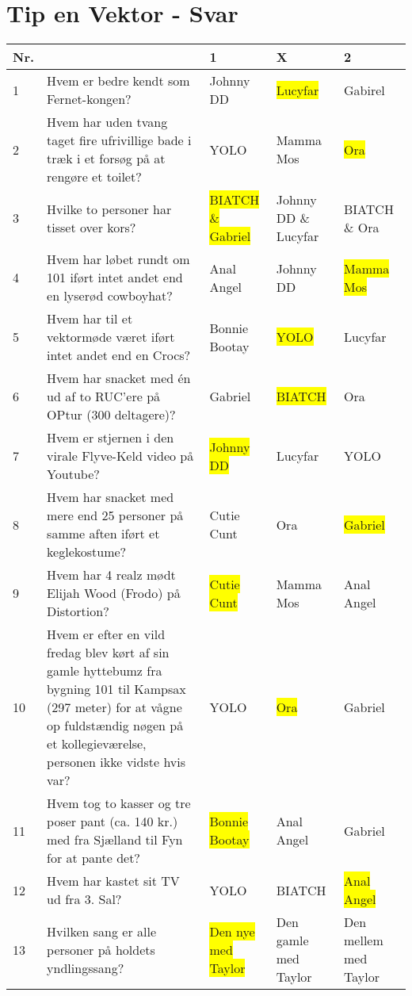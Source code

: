 \section{Tip en Vektor - Svar}
\begin{tabular}{ | p{0.5cm} | p{7cm} | p{2cm} | p{2cm} | p{2.3cm} | }
\hline
	Nr. &  & 1 & X & 2 \\ \hline
	1 & Hvem er bedre kendt som Fernet-kongen? & Johnny DD & \colorbox{Yellow}{Lucyfar}  & Gabirel \\ \hline
	2 & Hvem har uden tvang taget fire ufrivillige bade i træk i et forsøg på at rengøre et toilet? & YOLO & Mamma Mos & \colorbox{yellow}{Ora}   \\ \hline
	3 & Hvilke to personer har tisset over kors? & \colorbox{yellow}{BIATCH} \colorbox{yellow}{ \& Gabriel} & Johnny DD \& Lucyfar & BIATCH \& Ora \\ \hline
	4 & Hvem har løbet rundt om 101 iført intet andet end en lyserød cowboyhat? & Anal Angel & Johnny DD & \colorbox{yellow}{Mamma Mos} \\ \hline
	5 & Hvem har til et vektormøde været iført intet andet end en Crocs? & Bonnie Bootay & \colorbox{yellow}{YOLO} & Lucyfar \\ \hline
	6 & Hvem har snacket med én ud af to RUC’ere på OPtur (300 deltagere)? & Gabriel & \colorbox{yellow}{BIATCH} & Ora   \\ \hline
	7 & Hvem er stjernen i den virale Flyve-Keld video på Youtube? & \colorbox{yellow}{Johnny DD} & Lucyfar & YOLO \\ \hline
	8 & Hvem har snacket med mere end 25 personer på samme aften iført et keglekostume? & Cutie Cunt & Ora   & \colorbox{yellow}{Gabriel} \\ \hline
	9 & Hvem har 4 realz mødt Elijah Wood (Frodo) på Distortion? & \colorbox{yellow}{Cutie Cunt} & Mamma Mos & Anal Angel \\ \hline
	10 & Hvem er efter en vild fredag blev kørt af sin gamle hyttebumz fra bygning 101 til Kampsax (297 meter) for at vågne op fuldstændig nøgen på et kollegieværelse, personen ikke vidste hvis var? & YOLO & \colorbox{yellow}{Ora}   & Gabriel \\ \hline
	11 & Hvem tog to kasser og tre poser pant (ca. 140 kr.) med fra Sjælland til Fyn for at pante det? & \colorbox{yellow}{Bonnie} \colorbox{yellow}{ Bootay} & Anal Angel & Gabriel \\ \hline
	12 & Hvem har kastet sit TV ud fra 3. Sal? & YOLO & BIATCH & \colorbox{yellow}{Anal Angel} \\ \hline
	13 & Hvilken sang er alle personer på holdets yndlingssang? & \colorbox{yellow}{Den nye} \colorbox{yellow}{ med Taylor} & Den gamle med Taylor & Den mellem med Taylor \\ \hline
\end{tabular}
